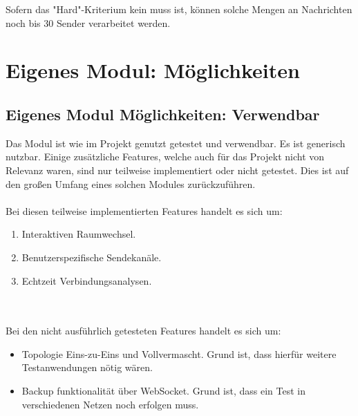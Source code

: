Sofern das "Hard"-Kriterium kein muss ist, können solche Mengen an Nachrichten noch bis 30 Sender verarbeitet werden.



\section{Eigenes Modul: Möglichkeiten}

\subsection{Eigenes Modul Möglichkeiten: Verwendbar}
Das Modul ist wie im Projekt genutzt getestet und verwendbar. 
Es ist generisch nutzbar.
Einige zusätzliche Features, welche auch für das Projekt nicht von Relevanz waren, sind nur teilweise implementiert oder nicht getestet. 
Dies ist auf den großen Umfang eines solchen Modules zurückzuführen. \\ \\
Bei diesen teilweise implementierten Features handelt es sich um:
\begin{enumerate}
\item
Interaktiven Raumwechsel.

\item
Benutzerspezifische Sendekanäle.

\item
Echtzeit Verbindungsanalysen.
\end{enumerate}
\\ \\
Bei den nicht ausführlich getesteten Features handelt es sich um:
\begin{itemize}
\item
Topologie Eins-zu-Eins und Vollvermascht. Grund ist, dass hierfür weitere Testanwendungen nötig wären.

\item
Backup funktionalität über WebSocket. Grund ist, dass ein Test in verschiedenen Netzen noch erfolgen muss.
\end{itemize}


